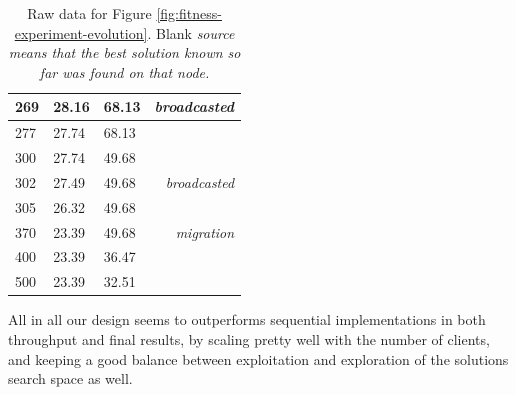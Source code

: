 \begin{table}[h!]
\begin{tabular}{|l|l|l|l|}
269                                        & 28.16                                       & 68.13                             & \multicolumn{1}{r|}{\textit{broadcasted}}     \\ \hline
277                                        & 27.74                                       & 68.13                             &                                               \\ \hline
300                                        & 27.74                                       & 49.68                             &                                               \\ \hline
302                                        & 27.49                                       & 49.68                             & \multicolumn{1}{r|}{\textit{broadcasted}}     \\ \hline
305                                        & 26.32                                       & 49.68                             &                                               \\ \hline
370                                        & 23.39                                       & 49.68                             & \multicolumn{1}{r|}{\textit{migration}}       \\ \hline
400                                        & 23.39                                       & 36.47                             &                                               \\ \hline
500                                        & 23.39                                       & 32.51                             &                                               \\ \hline
\end{tabular}
\caption{Raw data for Figure \ref{fig:fitness-experiment-evolution}. Blank \it{source} means that the best solution known so far was found on that node.  }
\label{tab:fitness-experiment-evolution}
\end{table}

All in all our design seems to outperforms sequential implementations in both throughput and final results, by scaling pretty well with the number of clients, and keeping a good balance between exploitation and exploration of the solutions search space as well.